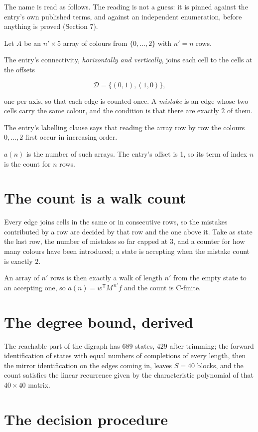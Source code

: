 \documentclass[11pt]{article}
\theoremstyle{definition}
\begin{document}
The name is read as follows. The reading is not a guess: it is pinned against the entry's own published terms, and against an independent enumeration, before anything is proved (Section 7).

Let $A$ be an $n' \times 5$ array of colours from $\{0,\dots,2\}$ with $n' = n$ rows.

The entry's connectivity, {\itshape horizontally and vertically}, joins each cell to the cells at the offsets

\[\mathcal{D} = \{(0,1), (1,0)\},\]

one per axis, so that each edge is counted once. A {\itshape mistake} is an edge whose two cells carry the same colour, and the condition is that there are exactly $2$ of them.

The entry's labelling clause says that reading the array row by row the colours $0,\dots,2$ first occur in increasing order.

$a(n)$ is the number of such arrays. The entry's offset is 1, so its term of index $n$ is the count for $n$ rows.

\section{The count is a walk count}

Every edge joins cells in the same or in consecutive rows, so the mistakes contributed by a row are decided by that row and the one above it. Take as state the last row, the number of mistakes so far capped at $3$, and a counter for how many colours have been introduced; a state is accepting when the mistake count is exactly $2$.

An array of $n'$ rows is then exactly a walk of length $n'$ from the empty state to an accepting one, so $a(n) = w^{\mathsf T}M^{\,n'}f$ and the count is C-finite.

\section{The degree bound, derived}

The reachable part of the digraph has $689$ states, $429$ after trimming; the forward identification of states with equal numbers of completions of every length, then the mirror identification on the edges coming in, leaves $S = 40$ blocks, and the count satisfies the linear recurrence given by the characteristic polynomial of that $40\times40$ matrix.

\section{The decision procedure}
\end{document}
